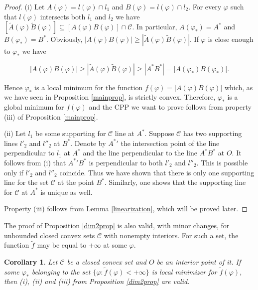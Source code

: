 \documentclass[a4paper,12pt]{amsart}
\newtheorem{cor}[thm]{Corollary}
\begin{document}
\begin{proof}
(i) Let ${A}(\varphi)=l(\varphi) \cap l_1$ and ${B}(\varphi)=
l(\varphi) \cap l_2$. For every $\varphi$ such that $l(\varphi)$
intersects both $l_1$ and $l_2$  we have
$[\tilde{A}(\varphi)\tilde{B}(\varphi)]\subseteq
[A(\varphi)B(\varphi)] \cap \mathcal C$. In particular,
${A}(\varphi_*) = A^*$ and ${B}(\varphi_*) = B^*$. Obviously, $
|A(\varphi)B(\varphi)| \geq |\tilde{A}(\varphi)
\tilde{B}(\varphi)|  $. If $\varphi$ is close enough to
$\varphi_*$ we have

$$ |A(\varphi)B(\varphi)| \geq |\tilde{A}(\varphi) \tilde{B}(\varphi)| \geq |A^*B^*|= |A(\varphi_*)B(\varphi_*)|.$$

\noindent Hence $\varphi_*$ is a local minimum for the function $
f(\varphi)=|{A}(\varphi) {B}(\varphi)|$ which, as we have seen in
Proposition \ref{mainprop}, is strictly convex. Therefore,
$\varphi_*$ is a global minimum for $f(\varphi)$ and the CPP we
want to prove follows from property (iii) of Proposition
\ref{mainprop}.

(ii) Let $l_1$ be some supporting for $\mathcal C$ line at $A^*$.
Suppose $\mathcal C$ has two supporting lines $l'_2$ and $l''_2$
at $B^*$. Denote by ${A^*}'$ the intersection point of the line
perpendicular to $l_1$ at $A^*$ and the line perpendicular to the
line $A^*B^*$ at $O$. It follows from (i) that ${A^*}'B^*$ is
perpendicular to both $l'_2$ and $l''_2$. This is possible only if
$l'_2$ and $l''_2$ coincide. Thus we have shown that there is only
one supporting line for  the set $\mathcal C$ at the point $B^*$.
Similarly, one shows that the supporting line for $\mathcal C$ at
$A^*$ is unique as well.

\smallskip

Property (iii) follows from Lemma \ref{linearization}, which will be proved later.
\end{proof}

\medskip

The proof of Proposition \ref{dim2prop} is also valid, with minor changes, for unbounded closed convex sets $\mathcal C$ with nonempty interiors. For such a set, the function $\tilde{f}$ may be equal to $+ \infty$ at some $\varphi$.

\begin{cor}
Let  $\mathcal C$ be a closed convex set and $O$ be an interior point of it. If some $\varphi_*$ belonging to the set $\{\varphi : \tilde{f}(\varphi) < + \infty\}$ is local minimizer for $\tilde{f}(\varphi)$,
then (i), (ii) and (iii) from Proposition \ref{dim2prop} are valid.
 \end{cor}
\end{document}
